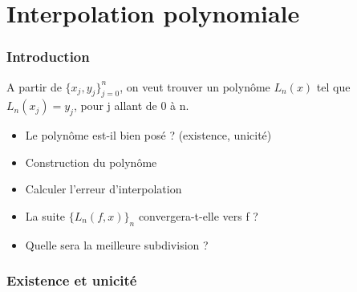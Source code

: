 \part{Interpolation polynomiale}
\section*{Introduction}

A partir de $\{x_j,y_j\}_{j=0}^n$, on veut trouver un polynôme $L_n(x)$ tel que $L_n(x_j)=y_j$, pour j allant de 0 à n.

\bigskip
\begin{itemize}
\item Le polynôme est-il bien posé ? (existence, unicité)
\item Construction du polynôme
\item Calculer l'erreur d'interpolation
\item La suite $\{L_n(f,x)\}_n$ convergera-t-elle vers f ?
\item Quelle sera la meilleure subdivision ?
\end{itemize}

\section{Existence et unicité}

